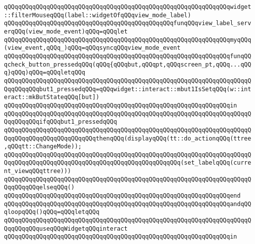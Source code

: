 \verb|qQQqqQQqqQQqqQQqqQQqqQQqqQQqqQQqqQQqqQQqqQQqqQQqqQQqqQQqqQQqqQQqwidget::filterMouseqQQq(label::widgetOfqQQqview_mode_label)|\newline
\newline
\verb|qQQqqQQqqQQqqQQqqQQqqQQqqQQqqQQqqQQqqQQqqQQqqQQqfunqQQqview_label_serverqQQq(view_mode_event)qQQq=qQQqlet|\newline
\verb|qQQqqQQqqQQqqQQqqQQqqQQqqQQqqQQqqQQqqQQqqQQqqQQqqQQqqQQqqQQqqQQqmyqQQq(view_event,qQQq_)qQQq=qQQqsyncqQQqview_mode_event|\newline
\newline
\verb|qQQqqQQqqQQqqQQqqQQqqQQqqQQqqQQqqQQqqQQqqQQqqQQqqQQqqQQqqQQqqQQqfunqQQqcheck_button_pressedqQQq(qQQq{qQQqbut,qQQqpt,qQQqscreen_pt,qQQq...qQQq}qQQq)qQQq=qQQqletqQQq|\newline
\verb|qQQqqQQqqQQqqQQqqQQqqQQqqQQqqQQqqQQqqQQqqQQqqQQqqQQqqQQqqQQqqQQqqQQqqQQqqQQqqQQqbut1_pressedqQQq=qQQqwidget::interact::mbut1IsSetqQQq(w::interact::mkButStateqQQq[but])|\newline
\newline
\verb|qQQqqQQqqQQqqQQqqQQqqQQqqQQqqQQqqQQqqQQqqQQqqQQqqQQqqQQqqQQqqQQqin|\newline
\verb|qQQqqQQqqQQqqQQqqQQqqQQqqQQqqQQqqQQqqQQqqQQqqQQqqQQqqQQqqQQqqQQqqQQqqQQqqQQqqQQqifqQQqbut1_pressedqQQq|\newline
\verb|qQQqqQQqqQQqqQQqqQQqqQQqqQQqqQQqqQQqqQQqqQQqqQQqqQQqqQQqqQQqqQQqqQQqqQQqqQQqqQQqqQQqqQQqqQQqqQQqthenqQQq(displayqQQq(tt::do_actionqQQq(ttree,qQQqtt::ChangeMode));|\newline
\verb|qQQqqQQqqQQqqQQqqQQqqQQqqQQqqQQqqQQqqQQqqQQqqQQqqQQqqQQqqQQqqQQqqQQqqQQqqQQqqQQqqQQqqQQqqQQqqQQqqQQqqQQqqQQqqQQqqQQqqQQq(set_labelqQQq(current_viewqQQqttree)))|\newline
\verb|qQQqqQQqqQQqqQQqqQQqqQQqqQQqqQQqqQQqqQQqqQQqqQQqqQQqqQQqqQQqqQQqqQQqqQQqqQQqqQQqelseqQQq()|\newline
\newline
\verb|qQQqqQQqqQQqqQQqqQQqqQQqqQQqqQQqqQQqqQQqqQQqqQQqqQQqqQQqqQQqqQQqend|\newline
\newline
\verb|qQQqqQQqqQQqqQQqqQQqqQQqqQQqqQQqqQQqqQQqqQQqqQQqqQQqqQQqqQQqqQQqandqQQqloopqQQq()qQQq=qQQqletqQQq|\newline
\verb|qQQqqQQqqQQqqQQqqQQqqQQqqQQqqQQqqQQqqQQqqQQqqQQqqQQqqQQqqQQqqQQqqQQqqQQqqQQqqQQquseqQQqWidgetqQQqinteract|\newline
\verb|qQQqqQQqqQQqqQQqqQQqqQQqqQQqqQQqqQQqqQQqqQQqqQQqqQQqqQQqqQQqqQQqin|\newline
